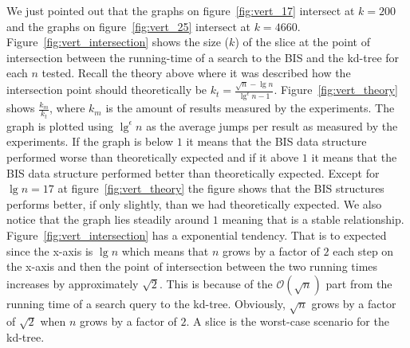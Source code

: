 We just pointed out that the graphs on figure~\ref{fig:vert_17} intersect at $k = 200$ and the graphs on  figure~\ref{fig:vert_25} intersect at $k = 4660$. Figure~\ref{fig:vert_intersection} shows the size ($k$) of the slice at the point of intersection between the running-time of a search to the BIS and the kd-tree for each $n$ tested. Recall the theory above where it was described how the intersection point should theoretically be $k_t = \frac{\sqrt{n} - \lg n}{\lg^\epsilon n - 1}$. Figure~\ref{fig:vert_theory} shows $\frac{k_m}{k_t}$, where $k_m$ is the amount of results measured by the experiments. The graph is plotted using $\lg^\epsilon n$ as the average jumps per result as measured by the experiments. If the graph is below $1$ it means that the BIS data structure performed worse than theoretically expected and if it above $1$ it means that the BIS data structure performed better than theoretically expected. Except for $\lg n = 17$ at figure~\ref{fig:vert_theory} the figure shows that the BIS structures performs better, if only slightly, than we had theoretically expected. We also notice that the graph lies steadily around $1$ meaning that is a stable relationship. Figure~\ref{fig:vert_intersection} has a exponential tendency. That is to expected since the x-axis is $\lg n$ which means that $n$ grows by a factor of $2$ each step on the x-axis and then the point of intersection between the two running times increases by approximately $\sqrt{2}$. This is because of the $\mathcal{O}(\sqrt{n})$ part from the running time of a search query to the kd-tree. Obviously, $\sqrt{n}$ grows by a factor of $\sqrt{2}$ when $n$ grows by a factor of $2$. A slice is the worst-case scenario for the kd-tree.

